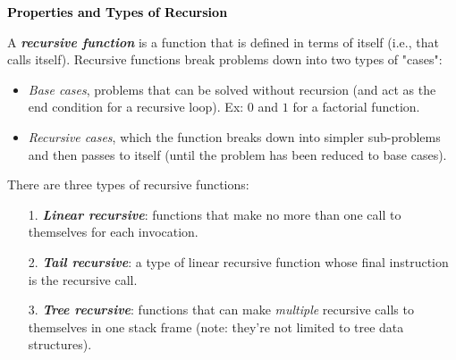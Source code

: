 \documentclass[6.6pt, twocolumn]{extarticle}
\newcommand{\blueheader}[1]{\textcolor{black}{\fontsize{7.00pt}{1.0}\bfseries{#1}}\vspace{0.2ex} }
\newcommand{\vocab}[1]{\textcolor{vocabcolor}{\bfseries{\emph{#1}}}}
\begin{document}
\begin{minipage}[c]{5.6cm}
\blueheader{Properties and Types of Recursion}

A \vocab{recursive function} is a function that is defined in terms of itself (i.e., that calls itself). Recursive functions break problems down into two types of "cases":
\begin{itemize}
    \item \textit{Base cases}, problems that can be solved without recursion (and act as the end condition for a recursive loop). Ex: $0$ and $1$ for a factorial function.
    \item \textit{Recursive cases}, which the function breaks down into simpler sub-problems and then passes to itself (until the problem has been reduced to base cases).
\end{itemize} %

There are three types of recursive functions:
\begin{itemize}
    \item[1.] \vocab{Linear recursive}: functions that make no more than one call to themselves for each invocation.
    \item[2.] \vocab{Tail recursive}: a type of linear recursive function whose final instruction is the recursive call.
    \item[3.] \vocab{Tree recursive}: functions that can make \textit{multiple} recursive calls to themselves in one stack frame (note: they're not limited to tree data structures). 
\end{itemize}
   \end{minipage}
   \hspace{0pt}
\end{document}
